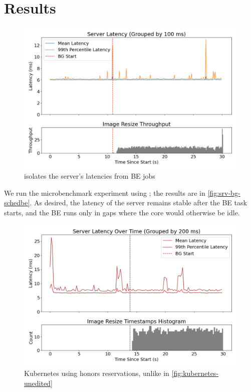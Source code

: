 \section{Results}

\begin{figure}[t]
    \centering
    \includegraphics[width=\columnwidth]{graphs/srv-bg-schedbe-low.png}
    \caption{ \beclass{} isolates the server's latencies from BE
     jobs}\label{fig:srv-bg-schedbe}
\end{figure}

We run the microbenchmark experiment using \beclass{}; the results are in
\autoref{fig:srv-bg-schedbe}. As desired, the latency of the server remains
stable after the BE task starts, and the BE runs only in gaps where the core
would otherwise be idle.

\begin{figure}[t]
    \centering
    \includegraphics[width=\columnwidth]{graphs/kubernetes-schedbe.png}
    \caption{ Kubernetes using \beclass{} honors reservations, unlike in
    \autoref{fig:kubernetes-unedited} }\label{fig:kubernetes-schedbe}
\end{figure}

